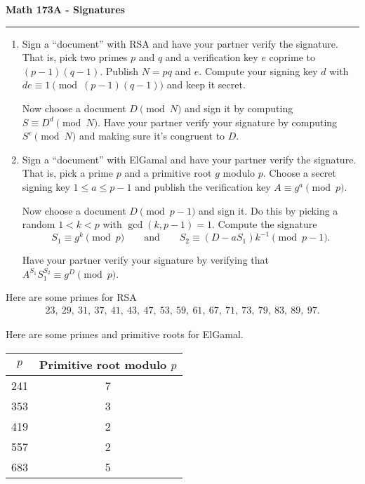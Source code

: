 \documentclass[11pt,letterpaper]{article}
\begin{document}
\begin{center}
{\bf \Large Math 173A - Signatures}
\vspace{0.2cm}
\hrule
\end{center}


\begin{enumerate}

    \item Sign a ``document'' with RSA and have your partner verify the signature.
    That is, pick two primes $p$ and $q$ and a verification key $e$ coprime to $(p-1)(q-1)$.
    Publish $N  = pq$ and $e$.
    Compute your signing key $d$ with $de\equiv 1 \pmod{(p-1)(q-1)}$ and keep it secret.

    Now choose a document $D \pmod N$ and sign it by computing $S \equiv D^d\pmod N$.
    Have your partner verify your signature by computing $S^e\pmod N$ and making sure it's congruent to $D$.


    \item Sign a ``document'' with ElGamal and have your partner verify the signature.
    That is, pick a prime $p$ and a primitive root $g$ modulo $p$.
    Choose a secret signing key $1\leq a\leq p-1$ and publish the verification key $A \equiv g^a\pmod p$.

    Now choose a document $D \pmod{p-1}$ and sign it.
    Do this by picking a random $1 < k < p$ with $\gcd(k, p-1) = 1$.
    Compute the signature
    \[
        S_1 \equiv g^k\pmod p\qquad \text{and}\qquad S_2 \equiv (D-aS_1)k^{-1}\pmod {p-1}.
    \]

    Have your partner verify your signature by verifying that $A^{S_1}S_1^{S_2}\equiv g^D\pmod p$.
\end{enumerate}
\vfill
Here are some primes for RSA
\begin{multline*}
    23,\ 29,\ 31,\ 37,\ 41,\ 43,\ 47,\ 53,\ 59,\ 61,\ 67,\ 71,\ 73,\ 79,\ 83,\ 89,\ 97.
\end{multline*}

\vfill

Here are some primes and primitive roots for ElGamal.

\begin{center}
    \begin{tabular}{|c|c|}
        \hline
        $p$ & Primitive root modulo $p$\\
        \hline
        241 & 7\\
        353 & 3\\
        419 & 2\\
        557 & 2\\
        683 & 5\\
        \hline
    \end{tabular}
\end{center}

\vfill
\end{document}
